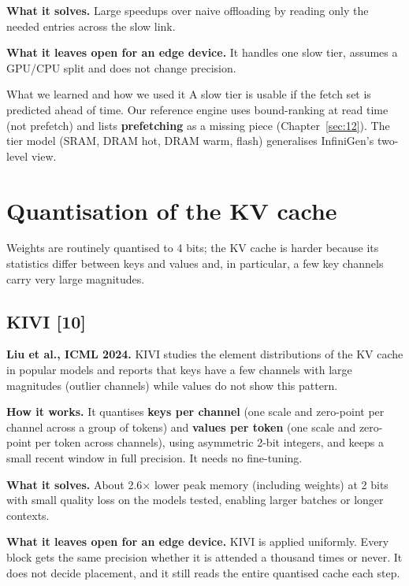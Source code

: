 \documentclass[12pt,a4paper]{report}
\begin{document}
\textbf{What it solves.} Large speedups over naive offloading by reading only the needed entries across the slow link.

\textbf{What it leaves open for an edge device.} It handles one slow tier, assumes a GPU/CPU split and does not change precision.

\begin{calloutbox}{What we learned and how we used it}
A slow tier is usable if the fetch set is predicted ahead of time. Our reference engine uses bound-ranking at read time (not prefetch) and lists \textbf{prefetching} as a missing piece (Chapter~\ref{sec:12}). The tier model (SRAM, DRAM hot, DRAM warm, flash) generalises InfiniGen's two-level view.

\end{calloutbox}
\section{Quantisation of the KV cache}\label{sec:2_6}
Weights are routinely quantised to 4 bits; the KV cache is harder because its statistics differ between keys and values and, in particular, a few key channels carry very large magnitudes.

\subsection{KIVI [10]}
\textbf{Liu et al., ICML 2024.} KIVI studies the element distributions of the KV cache in popular models and reports that keys have a few channels with large magnitudes (outlier channels) while values do not show this pattern.

\textbf{How it works.} It quantises \textbf{keys per channel} (one scale and zero-point per channel across a group of tokens) and \textbf{values per token} (one scale and zero-point per token across channels), using asymmetric 2-bit integers, and keeps a small recent window in full precision. It needs no fine-tuning.

\textbf{What it solves.} About 2.6× lower peak memory (including weights) at 2 bits with small quality loss on the models tested, enabling larger batches or longer contexts.

\textbf{What it leaves open for an edge device.} KIVI is applied uniformly. Every block gets the same precision whether it is attended a thousand times or never. It does not decide placement, and it still reads the entire quantised cache each step.
\end{document}
